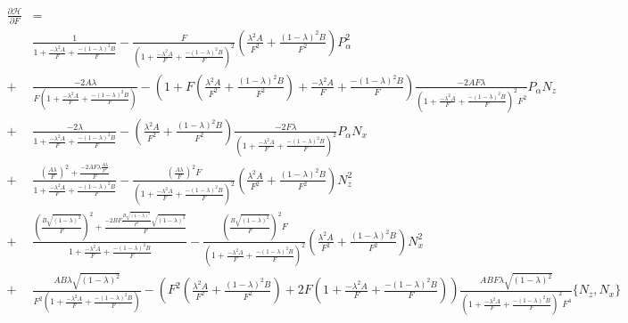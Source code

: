 \documentclass{article}
\begin{document}
\begin{align*}
	\frac{\partial \mathscr{H}}{\partial F} &= \\
	&\frac{1}{1 + \frac{ - \lambda^{2} A}{F} + \frac{ - \left( 1 - \lambda \right)^{2} B}{F}} - \frac{F}{\left( 1 + \frac{ - \lambda^{2} A}{F} + \frac{ - \left( 1 - \lambda \right)^{2} B}{F} \right)^{2}} \left( \frac{\lambda^{2} A}{F^{2}} + \frac{\left( 1 - \lambda \right)^{2} B}{F^{2}} \right) P_{\alpha}^{2} \\
	+& \frac{ - 2 A \lambda}{F \left( 1 + \frac{ - \lambda^{2} A}{F} + \frac{ - \left( 1 - \lambda \right)^{2} B}{F} \right)} - \left( 1 + F \left( \frac{\lambda^{2} A}{F^{2}} + \frac{\left( 1 - \lambda \right)^{2} B}{F^{2}} \right) + \frac{ - \lambda^{2} A}{F} + \frac{ - \left( 1 - \lambda \right)^{2} B}{F} \right) \frac{ - 2 A F \lambda}{\left( 1 + \frac{ - \lambda^{2} A}{F} + \frac{ - \left( 1 - \lambda \right)^{2} B}{F} \right)^{2} F^{2}} P_{\alpha}N_{z} \\
	+& \frac{ - 2 \lambda}{1 + \frac{ - \lambda^{2} A}{F} + \frac{ - \left( 1 - \lambda \right)^{2} B}{F}} - \left( \frac{\lambda^{2} A}{F^{2}} + \frac{\left( 1 - \lambda \right)^{2} B}{F^{2}} \right) \frac{ - 2 F \lambda}{\left( 1 + \frac{ - \lambda^{2} A}{F} + \frac{ - \left( 1 - \lambda \right)^{2} B}{F} \right)^{2}} P_{\alpha}N_{x} \\
	+& \frac{\left( \frac{A \lambda}{F} \right)^{2} + \frac{ - 2 A F \lambda \frac{A \lambda}{F^{2}}}{F}}{1 + \frac{ - \lambda^{2} A}{F} + \frac{ - \left( 1 - \lambda \right)^{2} B}{F}} - \frac{\left( \frac{A \lambda}{F} \right)^{2} F}{\left( 1 + \frac{ - \lambda^{2} A}{F} + \frac{ - \left( 1 - \lambda \right)^{2} B}{F} \right)^{2}} \left( \frac{\lambda^{2} A}{F^{2}} + \frac{\left( 1 - \lambda \right)^{2} B}{F^{2}} \right) N_{z}^{2} \\
	+& \frac{\left( \frac{B \sqrt{\left( 1 - \lambda \right)^{2}}}{F} \right)^{2} + \frac{ - 2 B F \frac{B \sqrt{\left( 1 - \lambda \right)^{2}}}{F^{2}} \sqrt{\left( 1 - \lambda \right)^{2}}}{F}}{1 + \frac{ - \lambda^{2} A}{F} + \frac{ - \left( 1 - \lambda \right)^{2} B}{F}} - \frac{\left( \frac{B \sqrt{\left( 1 - \lambda \right)^{2}}}{F} \right)^{2} F}{\left( 1 + \frac{ - \lambda^{2} A}{F} + \frac{ - \left( 1 - \lambda \right)^{2} B}{F} \right)^{2}} \left( \frac{\lambda^{2} A}{F^{2}} + \frac{\left( 1 - \lambda \right)^{2} B}{F^{2}} \right) N_{x}^{2} \\
	+& \frac{A B \lambda \sqrt{\left( 1 - \lambda \right)^{2}}}{F^{2} \left( 1 + \frac{ - \lambda^{2} A}{F} + \frac{ - \left( 1 - \lambda \right)^{2} B}{F} \right)} - \left( F^{2} \left( \frac{\lambda^{2} A}{F^{2}} + \frac{\left( 1 - \lambda \right)^{2} B}{F^{2}} \right) + 2 F \left( 1 + \frac{ - \lambda^{2} A}{F} + \frac{ - \left( 1 - \lambda \right)^{2} B}{F} \right) \right) \frac{A B F \lambda \sqrt{\left( 1 - \lambda \right)^{2}}}{\left( 1 + \frac{ - \lambda^{2} A}{F} + \frac{ - \left( 1 - \lambda \right)^{2} B}{F} \right)^{2} F^{4}} \{N_{z},N_{x}\}
\end{align*}
\end{document}
